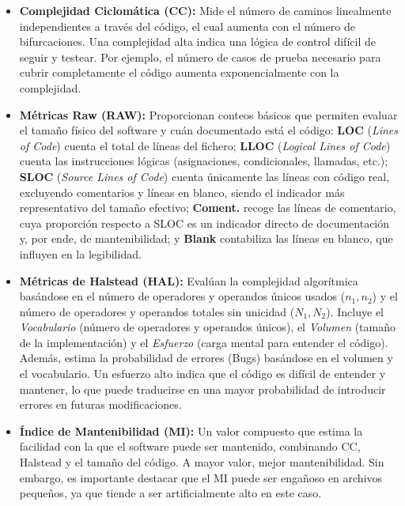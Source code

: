 \documentclass{article}
\begin{document}
\begin{itemize}
    \item \textbf{Complejidad Ciclomática (CC):} Mide el número de caminos linealmente
          independientes a través del código, el cual aumenta con el número de bifurcaciones.
          Una complejidad alta indica una lógica de control difícil de seguir y testear.
          Por ejemplo, el número de casos de prueba necesario para cubrir
          completamente el código aumenta exponencialmente con la complejidad.
    \item \textbf{Métricas Raw (RAW):} Proporcionan conteos básicos que permiten evaluar
          el tamaño físico del software y cuán documentado está el código:
          \textbf{LOC} (\textit{Lines of Code}) cuenta el total de líneas del fichero;
          \textbf{LLOC} (\textit{Logical Lines of Code}) cuenta las instrucciones lógicas
          (asignaciones, condicionales, llamadas, etc.);
          \textbf{SLOC} (\textit{Source Lines of Code}) cuenta únicamente las líneas con código
          real, excluyendo comentarios y líneas en blanco, siendo el indicador más representativo
          del tamaño efectivo;
          \textbf{Coment.} recoge las líneas de comentario, cuya proporción respecto a SLOC es un
          indicador directo de documentación y, por ende, de mantenibilidad;
          y \textbf{Blank} contabiliza las líneas en blanco, que influyen en la legibilidad.
    \item \textbf{Métricas de Halstead (HAL):} Evalúan la complejidad algorítmica basándose en el
          número de operadores y operandos únicos usados ($n_1, n_2$) y el número de operadores y
          operandos totales sin unicidad ($N_1, N_2$). Incluye el \textit{Vocabulario} (número de
          operadores y operandos únicos), el \textit{Volumen} (tamaño de la implementación) y
          el \textit{Esfuerzo} (carga mental para entender el código). Además, estima la probabilidad
          de errores (Bugs) basándose en el volumen y el vocabulario.
          Un esfuerzo alto indica que el código es difícil de entender y mantener, lo que puede
          traducirse en una mayor probabilidad de introducir errores en futuras modificaciones.
    \item \textbf{Índice de Mantenibilidad (MI):} Un valor compuesto que estima la
          facilidad con la que el software puede ser mantenido, combinando CC, Halstead y
          el tamaño del código. A mayor valor, mejor mantenibilidad. Sin embargo, es
          importante destacar que el MI puede ser engañoso en archivos pequeños, ya que
          tiende a ser artificialmente alto en este caso.
\end{itemize}
\end{document}
